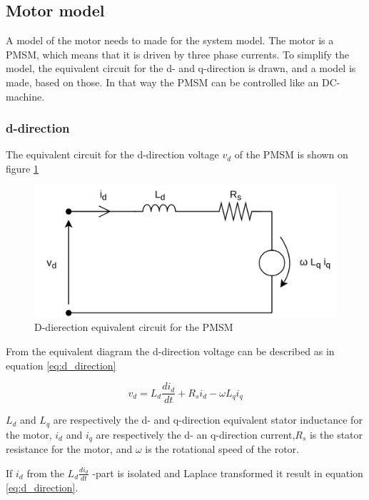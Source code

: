 \subsection{Motor model}
A model of the motor needs to made for the system model. The motor is a PMSM,  which means that it is driven by three phase currents. To simplify the model, the equivalent circuit for the d- and q-direction is drawn, and a model is made, based on those. In that way the PMSM can be controlled like an DC-machine.

\subsubsection{d-direction}
The equivalent circuit for the d-direction voltage $v_d$ of the PMSM is shown on figure \ref{fig:vd}

\begin{figure}[H]
	\centering
	\includegraphics[width=0.6\linewidth]{pictures/control/vd}
	\caption{D-dierection equivalent circuit for the PMSM}
	\label{fig:vd}
\end{figure}


From the equivalent diagram the d-direction voltage can be described as in equation \ref{eq:d_direction}

\begin{equation}
    \label{eq:d_direction}
    v_d = L_d \frac{d i_d}{dt} + R_s i_d - \omega L_q i_q
\end{equation}

$L_d$ and $L_q$ are respectively the d- and q-direction equivalent stator inductance for the motor, $i_d$ and $i_q$ are respectively the d- an q-direction current,$R_s$ is the stator resistance for the motor, and $\omega$ is the rotational speed of the rotor.

If $i_d$ from the $L_d \frac{di_d}{dt}$ -part is isolated and Laplace transformed it result in equation \ref{eq:d_direction}.

